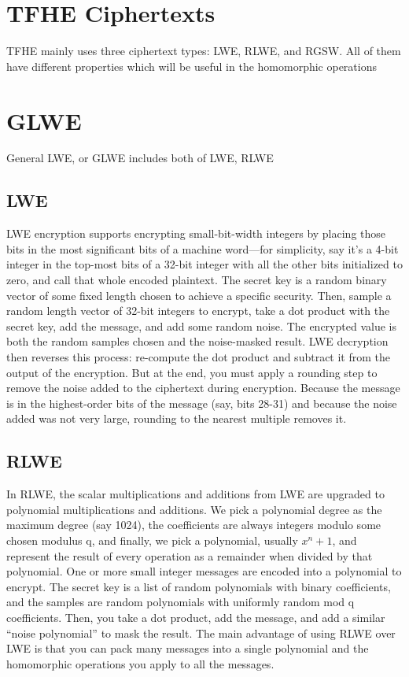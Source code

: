 \documentclass{techrep}
\theoremstyle{definition}
\theoremstyle{plain}
\begin{document}
	\section{TFHE Ciphertexts}
 TFHE mainly uses three ciphertext types: LWE, RLWE, and RGSW. All of them have different properties which will be useful in the homomorphic operations

	\section{GLWE}
General LWE, or GLWE includes both of LWE, RLWE

\subsection{LWE}
LWE encryption supports encrypting small-bit-width integers by placing those bits in the most significant bits of a machine word—for simplicity, say it’s a 4-bit integer in the top-most bits of a 32-bit integer with all the other bits initialized to zero, and call that whole encoded plaintext. The secret key is a random binary vector of some fixed length chosen to achieve a specific security. Then, sample a random length vector of 32-bit integers to encrypt, take a dot product with the secret key, add the message, and add some random noise. The encrypted value is both the random samples chosen and the noise-masked result. LWE decryption then reverses this process: re-compute the dot product and subtract it from the output of the encryption. But at the end, you must apply a rounding step to remove the noise added to the ciphertext during encryption. Because the message is in the highest-order bits of the message (say, bits 28-31) and because the noise added was not very large, rounding to the nearest multiple removes it. 

\subsection{RLWE}
In RLWE, the scalar multiplications and additions from LWE are upgraded to polynomial multiplications and additions. We pick a polynomial degree as the maximum degree (say 1024), the coefficients are always integers modulo some chosen modulus q, and finally, we pick a polynomial, usually $x^n+1$, and represent the result of every operation as a remainder when divided by that polynomial. One or more small integer messages are encoded into a polynomial to encrypt. The secret key is a list of random polynomials with binary coefficients, and the samples are random polynomials with uniformly random mod q coefficients. Then, you take a dot product, add the message, and add a similar “noise polynomial” to mask the result. The main advantage of using RLWE over LWE is that you can pack many messages into a single polynomial and the homomorphic operations you apply to all the messages. 
\end{document}
